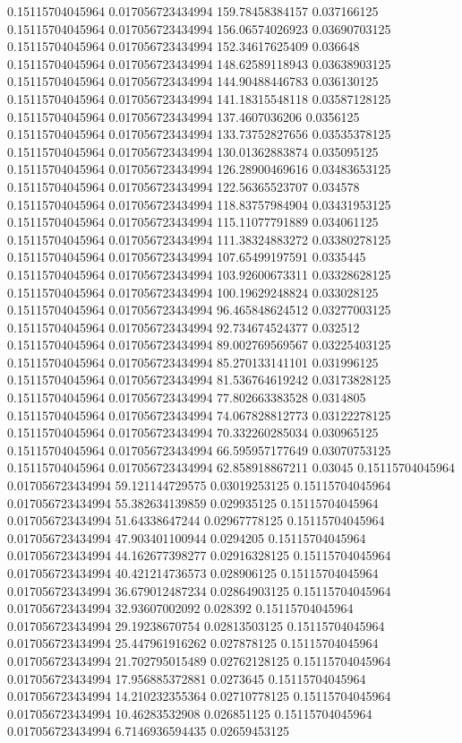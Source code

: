 0.15115704045964 0.017056723434994 159.78458384157 0.037166125
0.15115704045964 0.017056723434994 156.06574026923 0.03690703125
0.15115704045964 0.017056723434994 152.34617625409 0.036648
0.15115704045964 0.017056723434994 148.62589118943 0.03638903125
0.15115704045964 0.017056723434994 144.90488446783 0.036130125
0.15115704045964 0.017056723434994 141.18315548118 0.03587128125
0.15115704045964 0.017056723434994 137.4607036206 0.0356125
0.15115704045964 0.017056723434994 133.73752827656 0.03535378125
0.15115704045964 0.017056723434994 130.01362883874 0.035095125
0.15115704045964 0.017056723434994 126.28900469616 0.03483653125
0.15115704045964 0.017056723434994 122.56365523707 0.034578
0.15115704045964 0.017056723434994 118.83757984904 0.03431953125
0.15115704045964 0.017056723434994 115.11077791889 0.034061125
0.15115704045964 0.017056723434994 111.38324883272 0.03380278125
0.15115704045964 0.017056723434994 107.65499197591 0.0335445
0.15115704045964 0.017056723434994 103.92600673311 0.03328628125
0.15115704045964 0.017056723434994 100.19629248824 0.033028125
0.15115704045964 0.017056723434994 96.465848624512 0.03277003125
0.15115704045964 0.017056723434994 92.734674524377 0.032512
0.15115704045964 0.017056723434994 89.002769569567 0.03225403125
0.15115704045964 0.017056723434994 85.270133141101 0.031996125
0.15115704045964 0.017056723434994 81.536764619242 0.03173828125
0.15115704045964 0.017056723434994 77.802663383528 0.0314805
0.15115704045964 0.017056723434994 74.067828812773 0.03122278125
0.15115704045964 0.017056723434994 70.332260285034 0.030965125
0.15115704045964 0.017056723434994 66.595957177649 0.03070753125
0.15115704045964 0.017056723434994 62.858918867211 0.03045
0.15115704045964 0.017056723434994 59.121144729575 0.03019253125
0.15115704045964 0.017056723434994 55.382634139859 0.029935125
0.15115704045964 0.017056723434994 51.64338647244 0.02967778125
0.15115704045964 0.017056723434994 47.903401100944 0.0294205
0.15115704045964 0.017056723434994 44.162677398277 0.02916328125
0.15115704045964 0.017056723434994 40.421214736573 0.028906125
0.15115704045964 0.017056723434994 36.679012487234 0.02864903125
0.15115704045964 0.017056723434994 32.93607002092 0.028392
0.15115704045964 0.017056723434994 29.19238670754 0.02813503125
0.15115704045964 0.017056723434994 25.447961916262 0.027878125
0.15115704045964 0.017056723434994 21.702795015489 0.02762128125
0.15115704045964 0.017056723434994 17.956885372881 0.0273645
0.15115704045964 0.017056723434994 14.210232355364 0.02710778125
0.15115704045964 0.017056723434994 10.46283532908 0.026851125
0.15115704045964 0.017056723434994 6.7146936594435 0.02659453125
